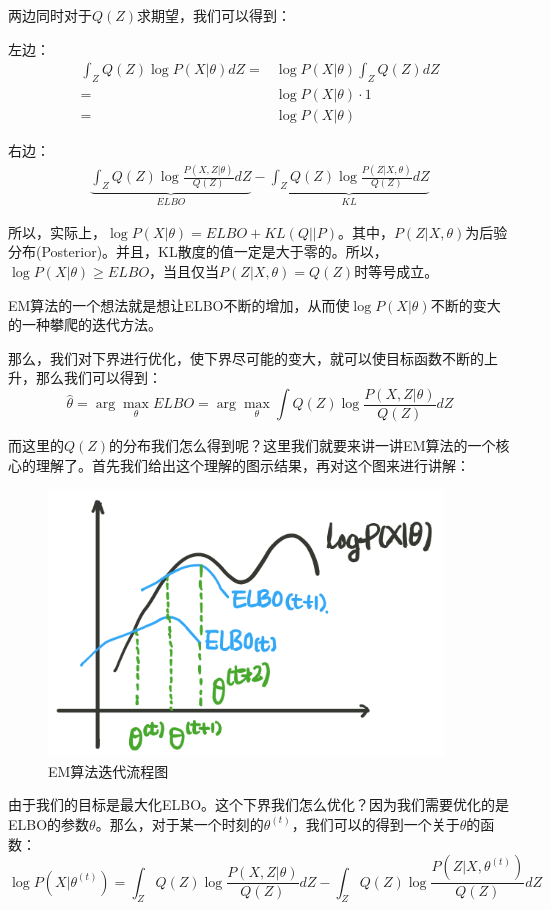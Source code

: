 \documentclass[a4paper]{article}
\begin{document}
两边同时对于$Q(Z)$求期望，我们可以得到：

左边：
\begin{equation}
    \begin{split}
    \int_Z Q(Z)\log P(X|\theta)  dZ 
    = &  \log P(X|\theta) \int_Z Q(Z) dZ \\    
    = &  \log P(X|\theta) \cdot 1 \\
    = &  \log P(X|\theta)
    \end{split}
\end{equation}

右边：
\begin{equation}
    \begin{split}
        \underbrace{\int_Z Q(Z) \log \frac{P(X,Z|\theta)}{Q(Z)}dZ}_{ELBO} - 
        \underbrace{\int_Z Q(Z) \log \frac{P(Z|X,\theta)}{Q(Z)}dZ}_{KL}
    \end{split}
\end{equation}

所以，实际上，$\log P(X|\theta) = ELBO + KL(Q||P)$。其中，$P(Z|X,\theta)$为后验分布(Posterior)。并且，KL散度的值一定是大于零的。所以，$\log P(X|\theta) \geq ELBO$，当且仅当$P(Z|X,\theta) = Q(Z)$时等号成立。

{\color{red} EM算法的一个想法就是想让ELBO不断的增加，从而使$\log P(X|\theta)$不断的变大的一种攀爬的迭代方法。}

那么，我们对下界进行优化，使下界尽可能的变大，就可以使目标函数不断的上升，那么我们可以得到：
\begin{equation}
    \hat{\theta} = \arg\max_{\theta} ELBO = \arg\max_{\theta} \int Q(Z)\log \frac{P(X,Z|\theta)}{Q(Z)}dZ
\end{equation}

而这里的$Q(Z)$的分布我们怎么得到呢？这里我们就要来讲一讲EM算法的一个核心的理解了。首先我们给出这个理解的图示结果，再对这个图来进行讲解：
\begin{figure}[H]
    \centering
    \includegraphics[width=.40\textwidth]{微信图片_20191218203645.png}
    \caption{EM算法迭代流程图}
    \label{fig:my_label_1}
\end{figure}

由于我们的目标是最大化ELBO。这个下界我们怎么优化？因为我们需要优化的是ELBO的参数$\theta$。那么，对于某一个时刻的$\theta^{(t)}$，我们可以的得到一个关于$\theta$的函数：
\begin{equation}
    \log P(X|\theta^{(t)}) = \int_Z Q(Z) \log \frac{P(X,Z|\theta)}{Q(Z)}dZ - \int_Z Q(Z) \log \frac{P(Z|X,\theta^{(t)})}{Q(Z)}dZ
\end{equation}
\end{document}

